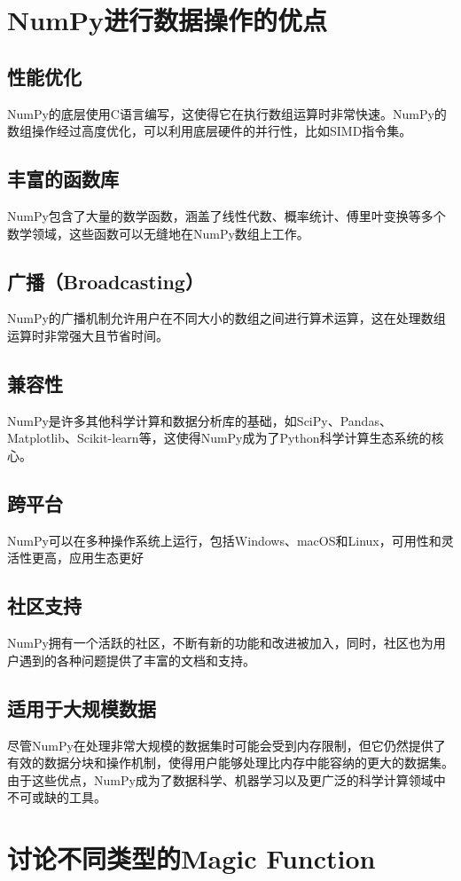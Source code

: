 \documentclass[10pt]{article}
\begin{document}
	
	
	
	\section{NumPy进行数据操作的优点}
	\subsection{性能优化}NumPy的底层使用C语言编写，这使得它在执行数组运算时非常快速。NumPy的数组操作经过高度优化，可以利用底层硬件的并行性，比如SIMD指令集。
	\subsection{丰富的函数库}NumPy包含了大量的数学函数，涵盖了线性代数、概率统计、傅里叶变换等多个数学领域，这些函数可以无缝地在NumPy数组上工作。
	\subsection{广播（Broadcasting）}NumPy的广播机制允许用户在不同大小的数组之间进行算术运算，这在处理数组运算时非常强大且节省时间。
	\subsection{兼容性}NumPy是许多其他科学计算和数据分析库的基础，如SciPy、Pandas、Matplotlib、Scikit-learn等，这使得NumPy成为了Python科学计算生态系统的核心。
	\subsection{跨平台}NumPy可以在多种操作系统上运行，包括Windows、macOS和Linux，可用性和灵活性更高，应用生态更好
	\subsection{社区支持}NumPy拥有一个活跃的社区，不断有新的功能和改进被加入，同时，社区也为用户遇到的各种问题提供了丰富的文档和支持。
	\subsection{适用于大规模数据}尽管NumPy在处理非常大规模的数据集时可能会受到内存限制，但它仍然提供了有效的数据分块和操作机制，使得用户能够处理比内存中能容纳的更大的数据集。 由于这些优点，NumPy成为了数据科学、机器学习以及更广泛的科学计算领域中不可或缺的工具。
	
	
	\section{讨论不同类型的Magic Function}
\end{document}
